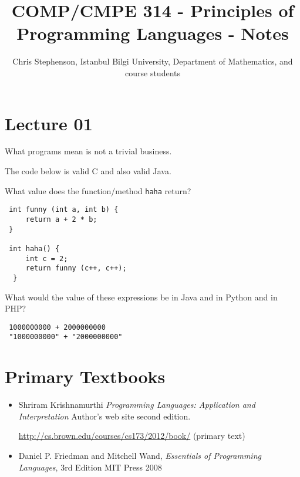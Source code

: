 \documentclass{article}
\begin{document}
\title{COMP/CMPE 314 - Principles of Programming Languages - Notes}
\author{Chris Stephenson, Istanbul Bilgi University, Department of Mathematics, and course students}
\maketitle

\section{Lecture 01}
What programs mean is not a trivial business.

The code below is valid C and also valid Java.

What value does the function/method \verb|haha| return?

\begin{verbatim}
 int funny (int a, int b) {
     return a + 2 * b;
 }
 
 int haha() {
     int c = 2;
     return funny (c++, c++);
  }
\end{verbatim}

What would the value of these expressions be in Java and in Python and in PHP?
\begin{verbatim}
 1000000000 + 2000000000
 "1000000000" + "2000000000"
\end{verbatim}



\section*{Primary Textbooks}
\begin{itemize}


\item Shriram Krishnamurthi \emph{Programming Languages: Application and Interpretation} Author's web site  second edition. 

\url{http://cs.brown.edu/courses/cs173/2012/book/} (primary text)

\item Daniel P. Friedman and Mitchell Wand, \emph{Essentials of Programming Languages}, 3rd Edition MIT Press 2008
\end{itemize}
\end{document}
